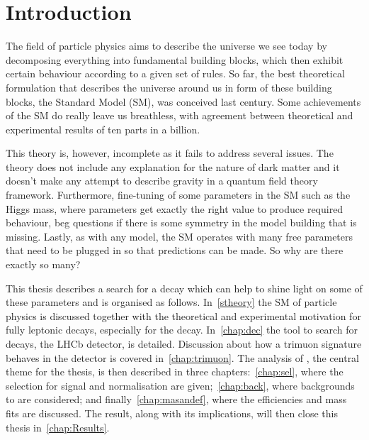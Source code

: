 \chapter{Introduction}



The field of particle physics aims to describe the universe we see today by decomposing everything into fundamental building blocks, which then exhibit certain behaviour according to a given set of rules. So far, the best theoretical formulation that describes the universe around us in form of these building blocks, the Standard Model (\Gls{SM}), was conceived last century. Some achievements of the \gls{SM} do really leave us breathless, with agreement between theoretical and experimental results of ten parts in a billion. 

This theory is, however, incomplete as it fails to address several issues. The theory does not include any explanation for the nature of dark matter and it doesn't make any attempt to describe gravity in a quantum field theory framework. Furthermore, fine-tuning of some parameters in the \gls{SM} such as the Higgs mass, where parameters get exactly the right value to produce required behaviour, beg questions if there is some symmetry in the model building that is missing. Lastly, as with any model, the \gls{SM} operates with many free parameters that need to be plugged in so that predictions can be made. So why are there exactly so many?

This thesis describes a search for a decay which can help to shine light on some of these parameters and is organised as follows. In~\autoref{stheory} the \gls{SM} of particle physics is discussed together with the theoretical and experimental motivation for fully leptonic decays, especially for the \Bmumumu decay. In~\autoref{chap:dec} the tool to search for \Bmumumu decays, the LHCb detector, is detailed. Discussion about how a trimuon signature behaves in the detector is covered in~\autoref{chap:trimuon}. The analysis of \Bmumumu, the central theme for the thesis, is then described in three chapters:~\autoref{chap:sel}, where the selection for signal and normalisation are given;~\autoref{chap:back}, where backgrounds to \Bmumumu are considered; and finally~\autoref{chap:masandef}, where the efficiencies and mass fits are discussed. The result, along with its implications, will then close this thesis in~\autoref{chap:Results}.

